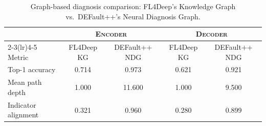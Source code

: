 \begin{table}[!htbp]
\centering
\caption{Graph-based diagnosis comparison: FL4Deep's Knowledge Graph vs.\ DEFault++'s Neural Diagnosis Graph.}
\label{tab:baseline_graph}
\small
\begin{tabular}{l cc cc}
\toprule
& \multicolumn{2}{c}{\textsc{Encoder}} & \multicolumn{2}{c}{\textsc{Decoder}} \\
\cmidrule(lr){2-3}\cmidrule(lr){4-5}
Metric & FL4Deep KG & DEFault++ NDG & FL4Deep KG & DEFault++ NDG \\
\midrule
Top-1 accuracy & 0.714 & 0.973 & 0.621 & 0.921 \\
Mean path depth & 1.000 & 11.600 & 1.000 & 9.500 \\
Indicator alignment & 0.321 & 0.960 & 0.280 & 0.899 \\
\bottomrule
\end{tabular}
\end{table}